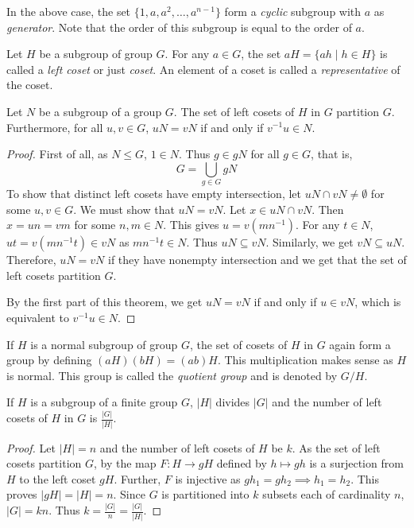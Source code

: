 In the above case, the set $\{1,a,a^2,\ldots,a^{n-1}\}$ form a \textit{cyclic} subgroup with $a$ as \textit{generator}. Note that the order of this subgroup is equal to the order of $a$.

\begin{definition}
\label{cosetDef}
    Let $H$ be a subgroup of group $G$. For any $a\in G$, the set $aH=\{ah\mid h\in H\}$ is called a \textit{left coset} or just \textit{coset}. An element of a coset is called a \textit{representative} of the coset.
\end{definition}

\begin{theorem}
\label{cosetPartition}
    Let $N$ be a subgroup of a group $G$. The set of left cosets of $H$ in $G$ partition $G$. Furthermore, for all $u,v\in G$, $uN=vN$ if and only if $v^{-1}u\in N$.
\end{theorem}
\begin{proof}
    First of all, as $N\leq G$, $1\in N$. Thus $g\in gN$ for all $g\in G$, that is,
    $$G=\bigcup_{g\in G}gN$$
    To show that distinct left cosets have empty intersection, let $uN\cap vN\neq\emptyset$ for some $u,v\in G$. We must show that $uN=vN$. Let $x\in uN\cap vN$. Then $x=un=vm$ for some $n,m\in N$. This gives $u=v(mn^{-1})$. For any $t\in N$, $ut=v(mn^{-1}t)\in vN$ as $mn^{-1}t\in N$. Thus $uN\subseteq vN$. Similarly, we get $vN\subseteq uN$. Therefore, $uN=vN$ if they have nonempty intersection and we get that the set of left cosets partition $G$.
    
    By the first part of this theorem, we get $uN=vN$ if and only if $u\in vN$, which is equivalent to $v^{-1}u\in N$.
\end{proof}


If $H$ is a normal subgroup of group $G$, the set of cosets of $H$ in $G$ again form a group by defining $(aH)(bH)=(ab)H$. This multiplication makes sense as $H$ is normal. This group is called the \textit{quotient group} and is denoted by $G/H$.

\begin{theorem}
\label{LagrangesTheorem}
    If $H$ is a subgroup of a finite group $G$, $|H|$ divides $|G|$ and the number of left cosets of $H$ in $G$ is $\frac{|G|}{|H|}$.
\end{theorem}
\begin{proof}
    Let $|H|=n$ and the number of left cosets of $H$ be $k$. As the set of left cosets partition $G$, by the map $F:H\to gH$ defined by $h\mapsto gh$ is a surjection from $H$ to the left coset $gH$. Further, $F$ is injective as $gh_1=gh_2\implies h_1=h_2$. This proves $|gH|=|H|=n$. Since $G$ is partitioned into $k$ subsets each of cardinality $n$, $|G|=kn$. Thus $k=\frac{|G|}{n}=\frac{|G|}{|H|}$.
\end{proof}

